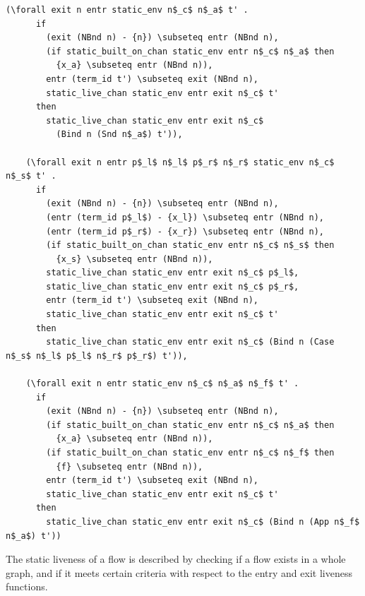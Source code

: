 \documentclass[10pt]{article}
\begin{document}
\begin{lstlisting}[language=logic, mathescape]
    (\forall exit n entr static_env n$_c$ n$_a$ t' .
      if 
        (exit (NBnd n) - {n}) \subseteq entr (NBnd n),
        (if static_built_on_chan static_env entr n$_c$ n$_a$ then
          {x_a} \subseteq entr (NBnd n)),
        entr (term_id t') \subseteq exit (NBnd n),
        static_live_chan static_env entr exit n$_c$ t'
      then
        static_live_chan static_env entr exit n$_c$
          (Bind n (Snd n$_a$) t')),

    (\forall exit n entr p$_l$ n$_l$ p$_r$ n$_r$ static_env n$_c$ n$_s$ t' .
      if 
        (exit (NBnd n) - {n}) \subseteq entr (NBnd n),
        (entr (term_id p$_l$) - {x_l}) \subseteq entr (NBnd n),
        (entr (term_id p$_r$) - {x_r}) \subseteq entr (NBnd n),
        (if static_built_on_chan static_env entr n$_c$ n$_s$ then
          {x_s} \subseteq entr (NBnd n)),
        static_live_chan static_env entr exit n$_c$ p$_l$,
        static_live_chan static_env entr exit n$_c$ p$_r$,
        entr (term_id t') \subseteq exit (NBnd n),
        static_live_chan static_env entr exit n$_c$ t'
      then 
        static_live_chan static_env entr exit n$_c$ (Bind n (Case n$_s$ n$_l$ p$_l$ n$_r$ p$_r$) t')),

    (\forall exit n entr static_env n$_c$ n$_a$ n$_f$ t' .
      if
        (exit (NBnd n) - {n}) \subseteq entr (NBnd n),
        (if static_built_on_chan static_env entr n$_c$ n$_a$ then
          {x_a} \subseteq entr (NBnd n)),
        (if static_built_on_chan static_env entr n$_c$ n$_f$ then
          {f} \subseteq entr (NBnd n)),
        entr (term_id t') \subseteq exit (NBnd n),
        static_live_chan static_env entr exit n$_c$ t'
      then
        static_live_chan static_env entr exit n$_c$ (Bind n (App n$_f$ n$_a$) t'))
  \end{lstlisting}

The static liveness of a flow is described by checking if a flow exists in a whole
graph, and if it meets certain criteria with respect to the entry and exit liveness
functions. 
\end{document}
